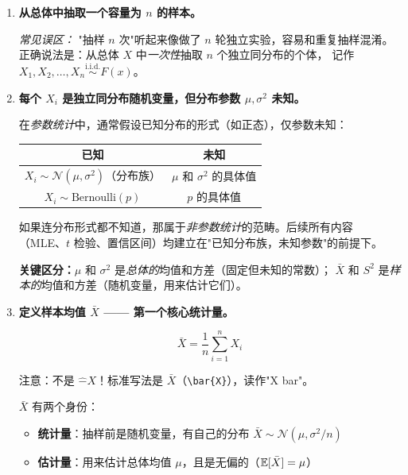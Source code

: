 \begin{enumerate}[label=\textbf{第 \arabic* 步}, leftmargin=*]

    \item \textbf{从总体中抽取一个容量为 $n$ 的样本。}

    \emph{常见误区：} "抽样 $n$ 次"听起来像做了 $n$ 轮独立实验，容易和重复抽样混淆。
    正确说法是：从总体 $X$ 中\emph{一次性}抽取 $n$ 个独立同分布的个体，
    记作 $X_1, X_2, \dots, X_n \stackrel{\mathrm{i.i.d.}}{\sim} F(x)$。

    \item \textbf{每个 $X_i$ 是独立同分布随机变量，但分布参数 $\mu, \sigma^2$ 未知。}

    在\emph{参数统计}中，通常假设已知分布的形式（如正态），仅参数未知：
    \begin{center}
    \begin{tabular}{c|c}
    \toprule
    已知 & 未知 \\
    \midrule
    $X_i \sim \mathcal{N}(\mu, \sigma^2)$（分布族） & $\mu$ 和 $\sigma^2$ 的具体值 \\
    $X_i \sim \mathrm{Bernoulli}(p)$               & $p$ 的具体值 \\
    \bottomrule
    \end{tabular}
    \end{center}

    如果连分布形式都不知道，那属于\emph{非参数统计}的范畴。后续所有内容
    （MLE、$t$ 检验、置信区间）均建立在"已知分布族，未知参数"的前提下。

    \textbf{关键区分：}$\mu$ 和 $\sigma^2$ 是\emph{总体的}均值和方差（固定但未知的常数）；
    $\bar{X}$ 和 $S^2$ 是\emph{样本的}均值和方差（随机变量，用来估计它们）。

    \item \textbf{定义样本均值 $\bar{X}$ —— 第一个核心统计量。}

    \begin{equation}
        \bar{X} = \frac{1}{n} \sum_{i=1}^{n} X_i
    \end{equation}

    注意：不是 $\hat{-}X$！标准写法是 $\bar{X}$（\verb|\bar{X}|），读作"X bar"。

    $\bar{X}$ 有两个身份：
    \begin{itemize}
        \item \textbf{统计量}：抽样前是随机变量，有自己的分布 $\bar{X} \sim \mathcal{N}(\mu, \sigma^2/n)$
        \item \textbf{估计量}：用来估计总体均值 $\mu$，且是无偏的（$\mathbb{E}[\bar{X}] = \mu$）
    \end{itemize}


\end{enumerate}
